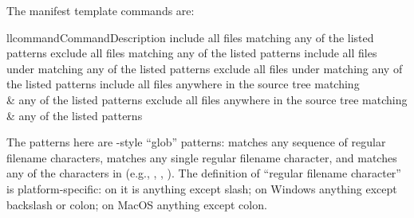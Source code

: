 \documentclass{howto}
\begin{document}

The manifest template commands are:
\begin{tableii}{ll}{command}{Command}{Description}
    {include all files matching any of the listed patterns}
    {exclude all files matching any of the listed patterns}
    {include all files under  matching any of the listed patterns}
    {exclude all files under  matching any of the listed patterns}
    {include all files anywhere in the source tree matching\\&
     any of the listed patterns}
    {exclude all files anywhere in the source tree matching\\&
     any of the listed patterns}
\end{tableii}
The patterns here are \UNIX-style ``glob'' patterns: \code{*} matches any
sequence of regular filename characters,  matches any single
regular filename character, and  matches any of the
characters in  (e.g., , ,
).  The definition of ``regular filename character'' is
platform-specific: on \UNIX{} it is anything except slash; on Windows
anything except backslash or colon; on MacOS anything except colon.











\end{document}
